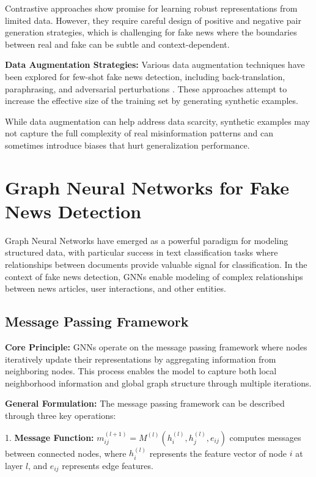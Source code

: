 Contrastive approaches show promise for learning robust representations from limited data. However, they require careful design of positive and negative pair generation strategies, which is challenging for fake news where the boundaries between real and fake can be subtle and context-dependent.

\textbf{Data Augmentation Strategies:} Various data augmentation techniques have been explored for few-shot fake news detection, including back-translation, paraphrasing, and adversarial perturbations \cite{longpre2020effective, kumar2020data}. These approaches attempt to increase the effective size of the training set by generating synthetic examples.

While data augmentation can help address data scarcity, synthetic examples may not capture the full complexity of real misinformation patterns and can sometimes introduce biases that hurt generalization performance.

\section{Graph Neural Networks for Fake News Detection}

Graph Neural Networks have emerged as a powerful paradigm for modeling structured data, with particular success in text classification tasks where relationships between documents provide valuable signal for classification. In the context of fake news detection, GNNs enable modeling of complex relationships between news articles, user interactions, and other entities.

\subsection{Message Passing Framework}

\textbf{Core Principle:} GNNs operate on the message passing framework where nodes iteratively update their representations by aggregating information from neighboring nodes. This process enables the model to capture both local neighborhood information and global graph structure through multiple iterations.

\textbf{General Formulation:} The message passing framework can be described through three key operations:

1. \textbf{Message Function:} $m_{ij}^{(l+1)} = M^{(l)}(h_i^{(l)}, h_j^{(l)}, e_{ij})$ computes messages between connected nodes, where $h_i^{(l)}$ represents the feature vector of node $i$ at layer $l$, and $e_{ij}$ represents edge features.

